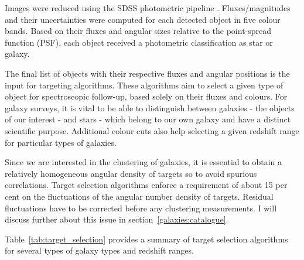 Images were reduced using the SDSS photometric pipeline 
\cite{luptonSDSSImagingPipelines2001, padmanabhanImprovedPhotometricCalibration2008}. 
Fluxes/magnitudes and their uncertainties 
were computed for each detected object in five colour bands. 
Based on their fluxes and angular sizes relative to the 
point-spread function (PSF), each object received a 
photometric classification as star or galaxy.

The final list of objects with their respective fluxes and 
angular positions is the input for targeting algorithms. 
These algorithms aim to select a given type of object for 
spectroscopic follow-up, based solely on their fluxes and colours. 
For galaxy surveys, it is vital to be able to distinguish between 
galaxies - the objects of our interest - and stars - which belong
to our own galaxy and have a distinct scientific purpose.
Additional colour cuts also help selecting a given redshift range 
for particular types of galaxies. 

Since we are interested in the clustering of 
galaxies, it is essential to obtain a relatively 
homogeneous angular density of targets so to avoid spurious 
correlations. Target selection algorithms enforce a requirement
of about 15 per cent on the fluctuations of the angular number density 
of targets. Residual fluctuations have to be corrected before
any clustering measurements. 
I will discuss further about this issue in section~\ref{galaxies:catalogue}. 

Table~\ref{tab:target_selection} provides a summary of target selection
algorithms for several types of galaxy types and redshift ranges. 

